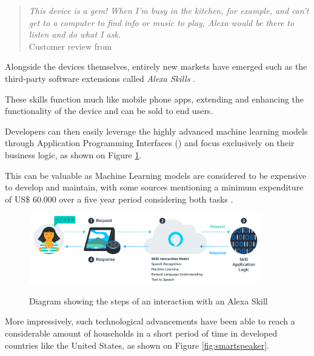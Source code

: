 \begin{quote}
    \textit{This device is a gem! When I’m busy in the kitchen, for example, and can’t get
    to a computer to find info or music to play, Alexa would be there to listen
    and do what I ask.} \\
    Customer review from \cite{GaoPanWangChen2018}
\end{quote}

Alongside the devices themselves, entirely new markets have emerged such as the
third-party software extensions called \textit{Alexa Skills} \cite{Alexa2022}.

These skills function much like mobile phone apps, extending and enhancing the
functionality of the device and can be sold to end users.

Developers can then easily leverage the highly advanced machine learning models
through Application Programming Interfaces () and focus exclusively on their business logic, as shown on Figure
\ref{fig:alexaskill}.

This can be valuable as Machine Learning models are considered to be
expensive to develop and maintain, with some sources mentioning a minimum expenditure 
of US\$ 60.000 over a five year period considering both tasks \cite{Phdata2021}.

\begin{figure}[htb!]
	\centering
	\caption[Diagram showing the steps of an interaction with an Alexa Skill]{Diagram showing the steps of an interaction with an Alexa Skill}
	\includegraphics[width=0.9\textwidth]{./images/skills.png} %
	\label{fig:alexaskill}
\end{figure}

More impressively, such technological advancements have been able to reach a
considerable amount of households in a short period of time in developed
countries like the United States, as shown on Figure \ref{fig:smartspeaker}.


